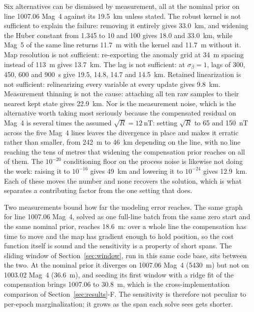 Six alternatives can be dismissed by measurement, all at the nominal prior on
line 1007.06 Mag~4 against its \SI{19.5}{\kilo\meter} unless stated. The robust
kernel is not sufficient to explain the failure: removing it entirely gives
\SI{33.0}{\kilo\meter}, and widening the Huber constant from \num{1.345} to
\num{10} and \num{100} gives \SI{18.0}{} and \SI{33.0}{\kilo\meter}, while Mag~5
of the same line returns \SI{11.7}{\meter} with the kernel and \SI{11.7}{\meter}
without it. Map resolution is not sufficient: re-exporting the anomaly grid at
\SI{34}{\meter} spacing instead of \SI{113}{\meter} gives \SI{13.7}{\kilo\meter}.
The lag is not sufficient: at $\sigma_{\beta}=1$, lags of \SI{300}{},
\SI{450}{}, \SI{600}{} and \SI{900}{\second} give \SI{19.5}{}, \SI{14.8}{},
\SI{14.7}{} and \SI{14.5}{\kilo\meter}. Retained linearization is not
sufficient: relinearizing every variable at every update gives
\SI{9.8}{\kilo\meter}. Measurement thinning is not the cause: attaching all ten
raw samples to their nearest kept state gives \SI{22.9}{\kilo\meter}. Nor is the
measurement noise, which is the alternative worth taking most seriously because
the compensated residual on Mag~4 is several times the assumed
$\sqrt{R}=\SI{12}{\nano\tesla}$: setting $\sqrt{R}$ to \SI{65}{} and
\SI{150}{\nano\tesla} across the five Mag~4 lines leaves the divergence in place
and makes it erratic rather than smaller, from \SI{242}{\meter} to
\SI{46}{\kilo\meter} depending on the line, with no line reaching the tens of
metres that widening the compensation prior reaches on all of them. The
$10^{-20}$ conditioning floor on the process noise is likewise not doing the
work: raising it to $10^{-16}$ gives \SI{49}{\kilo\meter} and lowering it to
$10^{-24}$ gives \SI{12.9}{\kilo\meter}. Each of these moves the number and none
recovers the solution, which is what separates a contributing factor from the
one setting that does.

Two measurements bound how far the modeling error reaches. The same graph for
line 1007.06 Mag~4, solved as one full-line batch from the same zero start and
the same nominal prior, reaches \SI{18.6}{\meter}: over a whole line the
compensation has time to move and the map has gradient enough to hold position,
so the cost function itself is sound and the sensitivity is a property of short
spans. The sliding window of Section~\ref{sec:window}, run in this same code
base, sits between the two. At the nominal prior it diverges on 1007.06 Mag~4
(\SI{5430}{\meter}) but not on 1003.02 Mag~4 (\SI{36.6}{\meter}), and seeding its
first window with a ridge fit of the compensation brings 1007.06 to
\SI{30.8}{\meter}, which is the cross-implementation comparison of
Section~\ref{sec:results}-F. The sensitivity is therefore not peculiar to
per-epoch marginalization; it grows as the span each solve sees gets shorter.

